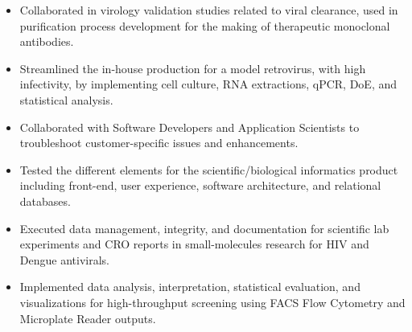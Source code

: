 \documentclass[10pt,a4paper]{altacv}
\begin{document}



\begin{itemize}
    \item   \small{Collaborated in virology validation studies related to viral clearance, used in purification process development for the making of therapeutic monoclonal antibodies.}
    \item   \small{Streamlined the in-house production for a model retrovirus, with high infectivity, by implementing cell culture, RNA extractions, qPCR, DoE, and statistical analysis.}
\end{itemize}

\medskip



\begin{itemize}
    \item   \small{Collaborated with Software Developers and Application Scientists to troubleshoot customer-specific issues and enhancements.}
    \item   \small{Tested the different elements for the scientific/biological informatics product including front-end, user experience, software architecture, and relational databases.}
\end{itemize}

\medskip




\begin{itemize}
    \item   \small{Executed data management, integrity, and documentation for scientific lab experiments and CRO reports in small-molecules research for HIV and Dengue antivirals.}
    \item   \small{Implemented data analysis, interpretation, statistical evaluation, and visualizations for high-throughput screening using FACS Flow Cytometry and Microplate Reader outputs.}
    
\end{itemize}
\end{document}
